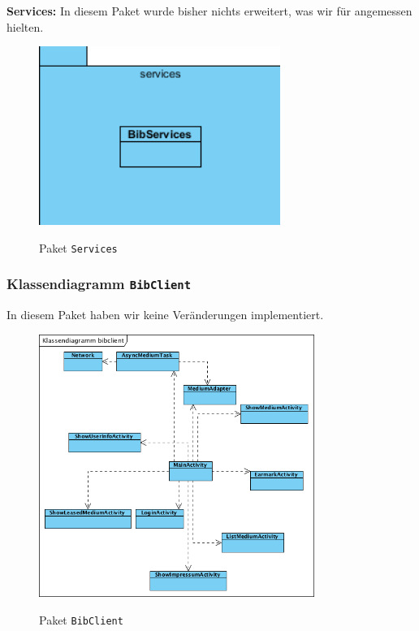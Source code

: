\documentclass[fontsize=12pt,paper=a4,twoside]{scrartcl}
\begin{document}
\textbf{Services:}
In diesem Paket wurde bisher nichts erweitert, was wir für angemessen hielten.
\begin{figure} [H] 
\caption{Paket \texttt{Services}} \centering
 \includegraphics[width=0.7\textwidth]{Diagramme/services.png} 
 \label{Services} 
\end{figure}


\subsubsection{Klassendiagramm \texttt{BibClient}}
In diesem Paket haben wir keine Veränderungen implementiert.
\begin{figure} [H] 
\caption{Paket \texttt{BibClient}} \centering
 \includegraphics[width=0.8\textwidth]{Diagramme/bibclient.png} 
 \label{BibClient} 
\end{figure}
\end{document}
